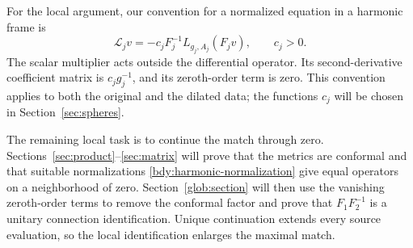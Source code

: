 For the local argument, our convention for a normalized equation in
a harmonic frame is
\begin{equation}\label{bdy:harmonic-normalization}
 \mathcal L_jv=-c_jF_j^{-1}L_{g_j,A_j}(F_jv),\qquad c_j>0.
\end{equation}
The scalar multiplier acts outside the differential operator.
Its second-derivative coefficient matrix is \(c_jg_j^{-1}\),
and its zeroth-order term is zero.  This convention applies to
both the original and the dilated data; the functions \(c_j\)
will be chosen in Section~\ref{sec:spheres}.

The remaining local task is to continue the match through zero.
Sections~\ref{sec:product}--\ref{sec:matrix} will prove that the
metrics are conformal and that suitable normalizations
\eqref{bdy:harmonic-normalization} give equal operators on a
neighborhood of zero.  Section~\ref{glob:section} will then use
the vanishing zeroth-order terms to remove the conformal factor
and prove that \(F_1F_2^{-1}\) is a unitary connection
identification.  Unique continuation extends every source
evaluation, so the local identification enlarges the maximal match.
